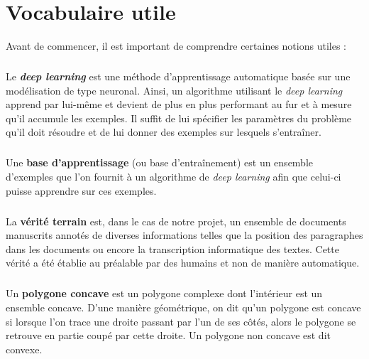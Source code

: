 \chapter{Vocabulaire utile}

Avant de commencer, il est important de comprendre certaines notions utiles :

\paragraph{}
Le \textbf{\textit{deep learning}} est une méthode d’apprentissage automatique basée sur une
modélisation de type neuronal. Ainsi, un algorithme utilisant le \textit{deep learning}
apprend par lui-même et devient de plus en plus performant au fur et à mesure qu’il accumule
les exemples. Il suffit de lui spécifier les paramètres du problème qu’il doit résoudre et de
lui donner des exemples sur lesquels s’entraîner.

\paragraph{}
Une \textbf{base d’apprentissage} (ou base d'entraînement) est un ensemble d’exemples
que l’on fournit à un algorithme de \textit{deep learning} afin que celui-ci puisse apprendre
sur ces exemples.

\paragraph{}
La \textbf{vérité terrain} est, dans le cas de notre projet, un ensemble de documents manuscrits
annotés de diverses informations telles que la position des paragraphes dans les documents ou encore la
transcription informatique des textes. Cette vérité a été établie au préalable par des humains et non
de manière automatique.

\paragraph{}
Un \textbf{polygone concave} est un polygone complexe dont l’intérieur est un ensemble concave.
D'une manière géométrique, on dit qu'un polygone est concave si lorsque l'on trace une droite passant
par l’un de ses côtés, alors le polygone se retrouve en partie coupé par cette droite.
Un polygone non concave est dit convexe.

